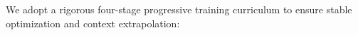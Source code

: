 We adopt a rigorous four-stage progressive training curriculum to ensure stable optimization and context extrapolation:
